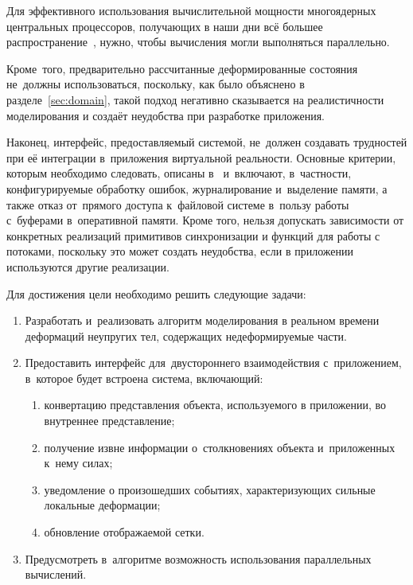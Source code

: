 \documentclass[a4paper, 14pt, titlepage]{extarticle}
\begin{document}
    Для эффективного использования вычислительной мощности многоядерных центральных процессоров,
    получающих в наши дни всё большее распространение~\cite{steam-hardware}, нужно, чтобы вычисления могли
    выполняться параллельно.

    Кроме~того, предварительно рассчитанные деформированные состояния не~должны использоваться,
    поскольку, как было объяснено в разделе~\ref{sec:domain}, такой подход негативно сказывается на реалистичности
    моделирования и создаёт неудобства при разработке приложения.

    Наконец, интерфейс, предоставляемый системой, не~должен создавать трудностей при её интеграции
    в~приложения виртуальной реальности. Основные критерии, которым необходимо следовать,
    описаны в~\cite{gems-middleware} и~включают, в~частности, конфигурируемые обработку ошибок,
    журналирование и~выделение памяти, а также отказ от~прямого доступа к~файловой системе в~пользу
    работы с~буферами в~оперативной памяти. Кроме того, нельзя допускать зависимости от конкретных
    реализаций примитивов синхронизации и функций для работы с потоками, поскольку это может создать
    неудобства, если в приложении используются другие реализации.

    Для достижения цели необходимо решить следующие задачи:
    \begin{enumerate}
      \item Разработать и~реализовать алгоритм моделирования в реальном времени деформаций
        не\-у\-пру\-гих тел, содержащих недеформируемые части.
      \item Предоставить интерфейс для~двустороннего взаимодействия с~приложением, в~которое будет
        встроена система, включающий:
        \begin{enumerate}
          \item конвертацию представления объекта, используемого в приложении, во внутреннее представление;
          \item получение извне информации о~столкновениях объекта и~приложенных к~нему силах;
          \item уведомление о произошедших событиях, характеризующих сильные локальные деформации;
          \item обновление отображаемой сетки.
        \end{enumerate}
      \item Предусмотреть в~алгоритме возможность использования параллельных вычислений.
    \end{enumerate}
\end{document}
